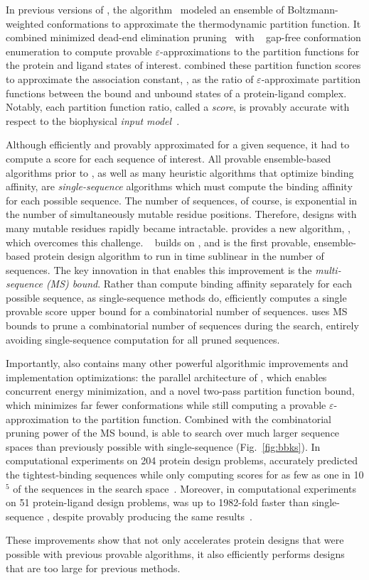 \def\multisequencebound{MS\xspace}
\def\msbound{\multisequencebound}


\newcommand{\cut}[1]{}

In previous versions of \osprey, the \ks algorithm~\cite{K*} modeled an ensemble of Boltzmann-weighted conformations to approximate the thermodynamic partition function. It combined minimized dead-end elimination pruning~\cite{DEE} with \as~\cite{DEE,A*} gap-free conformation enumeration to compute provable $\varepsilon$-approximations to the partition functions for the protein and ligand states of interest. \ks combined these partition function scores to approximate the association constant, \ka, as the ratio of $\varepsilon$-approximate partition functions between the bound and unbound states of a protein-ligand complex. Notably, each partition function ratio, called a \ks \emph{score}, is provably accurate with respect to the biophysical \emph{input model}~\cite{K*,minDEE,iMinDEE}. 

Although \ks efficiently and provably approximated \ka for a given sequence, it had to compute a \ks score for each sequence of interest. All provable ensemble-based algorithms prior to \bbks, as well as many heuristic algorithms that optimize binding affinity, are \emph{single-sequence} algorithms which must compute the binding affinity for each possible sequence. The number of sequences, of course, is exponential in the number of simultaneously mutable residue positions.  Therefore, designs with many mutable residues rapidly became intractable.  provides a new algorithm, \bbks, which overcomes this challenge. \bbks~\cite{BBK*} builds on \ks, and is the first provable, ensemble-based protein design algorithm to run in time sublinear in the number of sequences. The key innovation in \bbks that enables this improvement is the \emph{multi-sequence (\msbound) bound}. Rather than compute binding affinity separately for each possible sequence, as single-sequence methods do, \bbks efficiently computes a single provable \ks score upper bound for a combinatorial number of sequences. \bbks uses \msbound bounds to prune a combinatorial number of sequences during the search, entirely avoiding single-sequence computation for all pruned sequences.

Importantly, \bbks also contains many other powerful algorithmic improvements and implementation optimizations: the parallel architecture of \bbks, which enables concurrent energy minimization, and a novel two-pass partition function bound, which minimizes far fewer conformations while still computing a provable $\varepsilon$-approximation to the partition function. Combined with the combinatorial pruning power of the \msbound bound, \bbks is able to search over much larger sequence spaces than previously possible with single-sequence \ks (Fig.~\ref{fig:bbks}). In computational experiments on 204 protein design problems, \bbks accurately predicted the tightest-binding sequences while only computing \ks scores for as few as one in 10$^5$ of the sequences in the search space~\cite{BBK*}.  Moreover, in computational experiments on 51 protein-ligand design problems, \bbks was up to 1982-fold faster than single-sequence \ks, despite provably producing the same results~\cite{BBK*}.  

These improvements show that \bbks not only accelerates protein designs that were possible with previous provable algorithms, it also efficiently performs designs that are too large for previous methods.

